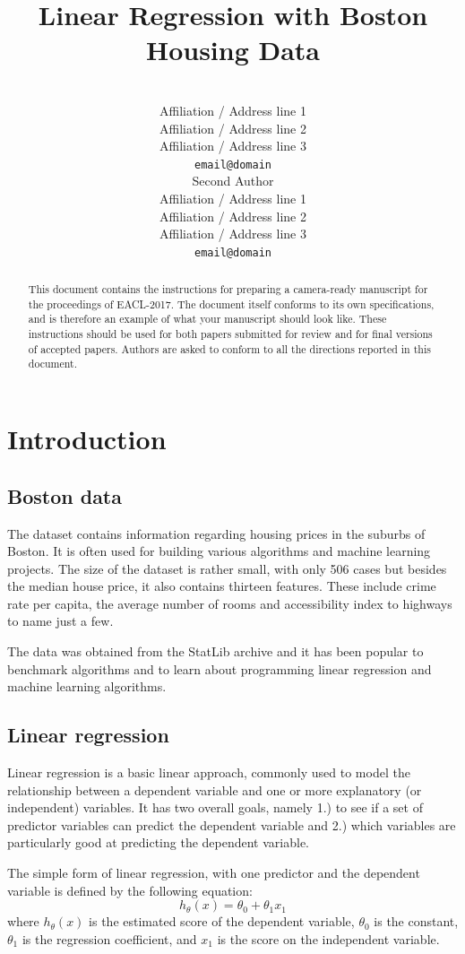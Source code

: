 \documentclass[11pt]{article}
\title{Linear Regression with Boston Housing Data}
\author{ \\
  Affiliation / Address line 1 \\
  Affiliation / Address line 2 \\
  Affiliation / Address line 3 \\
  {\tt email@domain} \\\And
  Second Author \\
  Affiliation / Address line 1 \\
  Affiliation / Address line 2 \\
  Affiliation / Address line 3 \\
  {\tt email@domain} \\}
\date{}
\begin{document}
\maketitle
\begin{abstract}
  This document contains the instructions for preparing a camera-ready
  manuscript for the proceedings of EACL-2017. The document itself
  conforms to its own specifications, and is therefore an example of
  what your manuscript should look like. These instructions should be
  used for both papers submitted for review and for final versions of
  accepted papers.  Authors are asked to conform to all the directions
  reported in this document.
\end{abstract}

\section{Introduction}
\subsection{Boston data}
  The dataset contains information regarding housing prices in the suburbs of Boston. It is often used for building various algorithms and machine learning projects. The size of the dataset is rather small, with only 506 cases but besides the median house price, it also contains thirteen features. These include crime rate per capita, the average number of rooms and accessibility index to highways to name just a few. 

The data was obtained from the StatLib archive and it has been popular to benchmark algorithms and to learn about programming linear regression and machine learning algorithms.

\subsection{Linear regression}
Linear regression is a basic linear approach, commonly used to model the relationship between a dependent variable and one or more explanatory (or independent) variables. It has two overall goals, namely 1.) to see if a set of predictor variables can predict the dependent variable and 2.) which variables are particularly good at predicting the dependent variable.

The simple form of linear regression, with one predictor and the dependent variable is defined by the following equation:   
  \[h_{\theta}(x) = \theta_{0} + \theta_{1}x_{1}\]
  where $h_{\theta}(x)$ is the estimated score of the dependent variable, $\theta_{0}$ is the constant,  $\theta_{1}$ is the regression coefficient, and $x_{1}$ is the score on the independent variable.
\end{document}
